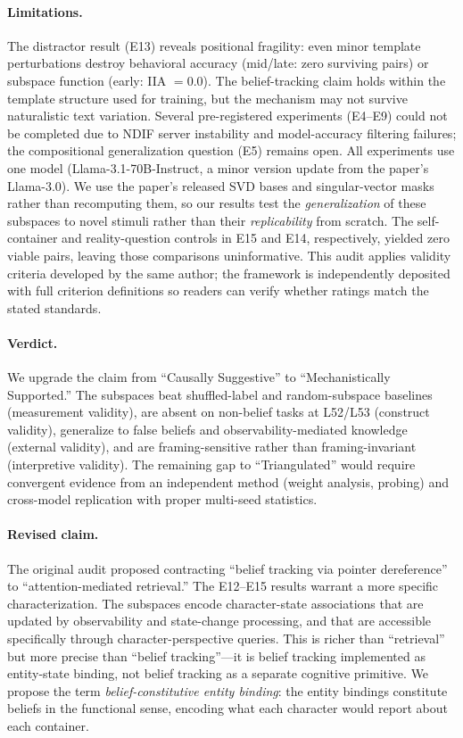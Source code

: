 \documentclass[11pt]{article}
\begin{document}
\paragraph{Limitations.}
The distractor result (E13) reveals positional fragility: even minor template perturbations destroy behavioral accuracy (mid/late: zero surviving pairs) or subspace function (early: IIA $= 0.0$). The belief-tracking claim holds within the template structure used for training, but the mechanism may not survive naturalistic text variation. Several pre-registered experiments (E4--E9) could not be completed due to NDIF server instability and model-accuracy filtering failures; the compositional generalization question (E5) remains open. All experiments use one model (Llama-3.1-70B-Instruct, a minor version update from the paper's Llama-3.0). We use the paper's released SVD bases and singular-vector masks rather than recomputing them, so our results test the \emph{generalization} of these subspaces to novel stimuli rather than their \emph{replicability} from scratch. The self-container and reality-question controls in E15 and E14, respectively, yielded zero viable pairs, leaving those comparisons uninformative. This audit applies validity criteria developed by the same author; the framework is independently deposited with full criterion definitions so readers can verify whether ratings match the stated standards.

\paragraph{Verdict.}
We upgrade the claim from ``Causally Suggestive'' to ``Mechanistically Supported.'' The subspaces beat shuffled-label and random-subspace baselines (measurement validity), are absent on non-belief tasks at L52/L53 (construct validity), generalize to false beliefs and observability-mediated knowledge (external validity), and are framing-sensitive rather than framing-invariant (interpretive validity). The remaining gap to ``Triangulated'' would require convergent evidence from an independent method (weight analysis, probing) and cross-model replication with proper multi-seed statistics.

\paragraph{Revised claim.}
The original audit proposed contracting ``belief tracking via pointer dereference'' to ``attention-mediated retrieval.'' The E12--E15 results warrant a more specific characterization. The subspaces encode character-state associations that are updated by observability and state-change processing, and that are accessible specifically through character-perspective queries. This is richer than ``retrieval'' but more precise than ``belief tracking''---it is belief tracking implemented as entity-state binding, not belief tracking as a separate cognitive primitive. We propose the term \emph{belief-constitutive entity binding}: the entity bindings constitute beliefs in the functional sense, encoding what each character would report about each container.
\end{document}
